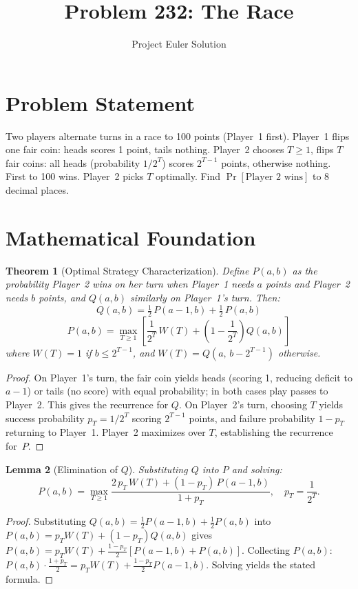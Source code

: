 \documentclass[12pt]{article}
\title{Problem 232: The Race}
\author{Project Euler Solution}
\date{}
\newtheorem{theorem}{Theorem}
\newtheorem{lemma}[theorem]{Lemma}
\begin{document}
\maketitle

\section{Problem Statement}
Two players alternate turns in a race to 100 points (Player~1 first). Player~1 flips one fair coin: heads scores 1 point, tails nothing. Player~2 chooses $T \geq 1$, flips $T$ fair coins: all heads (probability $1/2^T$) scores $2^{T-1}$ points, otherwise nothing. First to 100 wins. Player~2 picks $T$ optimally. Find $\Pr[\text{Player 2 wins}]$ to 8 decimal places.

\section{Mathematical Foundation}

\begin{theorem}[Optimal Strategy Characterization]
Define $P(a,b)$ as the probability Player~2 wins on her turn when Player~1 needs $a$ points and Player~2 needs $b$ points, and $Q(a,b)$ similarly on Player~1's turn. Then:
\[
Q(a,b) = \tfrac{1}{2}\,P(a{-}1,b) + \tfrac{1}{2}\,P(a,b)
\]
\[
P(a,b) = \max_{T \geq 1}\!\left[\frac{1}{2^T}\,W(T) + \left(1 - \frac{1}{2^T}\right)Q(a,b)\right]
\]
where $W(T) = 1$ if $b \leq 2^{T-1}$, and $W(T) = Q(a,\, b-2^{T-1})$ otherwise.
\end{theorem}

\begin{proof}
On Player~1's turn, the fair coin yields heads (scoring 1, reducing deficit to $a-1$) or tails (no score) with equal probability; in both cases play passes to Player~2. This gives the recurrence for $Q$. On Player~2's turn, choosing $T$ yields success probability $p_T = 1/2^T$ scoring $2^{T-1}$ points, and failure probability $1-p_T$ returning to Player~1. Player~2 maximizes over $T$, establishing the recurrence for~$P$.
\end{proof}

\begin{lemma}[Elimination of $Q$]
Substituting $Q$ into $P$ and solving:
\[
P(a,b) = \max_{T \geq 1} \frac{2\,p_T\,W(T) + (1-p_T)\,P(a{-}1,b)}{1+p_T}, \quad p_T = \frac{1}{2^T}.
\]
\end{lemma}

\begin{proof}
Substituting $Q(a,b) = \frac{1}{2}P(a{-}1,b) + \frac{1}{2}P(a,b)$ into $P(a,b) = p_T W(T) + (1-p_T)Q(a,b)$ gives $P(a,b) = p_T W(T) + \frac{1-p_T}{2}[P(a{-}1,b) + P(a,b)]$. Collecting $P(a,b)$: $P(a,b)\cdot\frac{1+p_T}{2} = p_T W(T) + \frac{1-p_T}{2}P(a{-}1,b)$. Solving yields the stated formula.
\end{proof}
\end{document}

